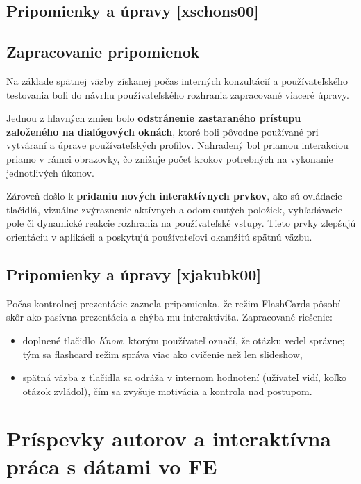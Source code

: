 \documentclass[a4paper,12pt]{article}
\begin{document}
\subsection{Pripomienky a úpravy [xschons00]}
\subsection{Zapracovanie pripomienok}

Na základe spätnej väzby získanej počas interných konzultácií a používateľského testovania boli do návrhu používateľského rozhrania zapracované viaceré úpravy.

Jednou z hlavných zmien bolo \textbf{odstránenie zastaraného prístupu založeného na dialógových oknách}, ktoré boli pôvodne používané pri vytváraní a úprave používateľských profilov. Nahradený bol priamou interakciou priamo v rámci obrazovky, čo znižuje počet krokov potrebných na vykonanie jednotlivých úkonov.

Zároveň došlo k \textbf{pridaniu nových interaktívnych prvkov}, ako sú ovládacie tlačidlá, vizuálne zvýraznenie aktívnych a odomknutých položiek, vyhľadávacie pole či dynamické reakcie rozhrania na používateľské vstupy. Tieto prvky zlepšujú orientáciu v aplikácii a poskytujú používateľovi okamžitú spätnú väzbu.

\subsection{Pripomienky a úpravy [xjakubk00]}

Počas kontrolnej prezentácie zaznela pripomienka, že režim FlashCards pôsobí skôr ako pasívna prezentácia a chýba mu interaktivita. Zapracované riešenie:
\begin{itemize}
	\item doplnené tlačidlo \textit{Know}, ktorým používateľ označí, že otázku vedel správne; tým sa flashcard režim správa viac ako cvičenie než len slideshow,
	\item spätná väzba z tlačidla sa odráža v internom hodnotení (užívateľ vidí, koľko otázok zvládol), čím sa zvyšuje motivácia a kontrola nad postupom.
\end{itemize}

\section{Príspevky autorov a interaktívna práca s dátami vo FE}
\end{document}
